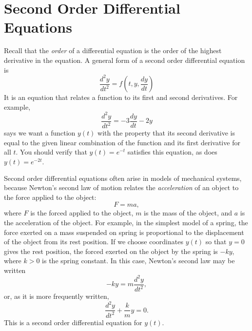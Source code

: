 \documentclass[reqno]{immbook}
\numberwithin{equation}{chapter}
\numberwithin{question}{section}
\numberwithin{theorem}{chapter}
\numberwithin{figure}{chapter}
\theoremstyle{definition}
\begin{document}
\section{Second Order Differential Equations}
Recall that the \emph{order} of a differential equation
is the order of the highest derivative in the equation.
A general form of a second order differential equation is
\begin{equation}
   \frac{d^2y}{dt^2} = f\left(t,y,\frac{dy}{dt}\right)
\label{eqn:generalsecondorder}
\end{equation}
It is an equation that relates a function to its first
and second derivatives.  For example,
\begin{equation}
  \frac{d^2y}{dt^2} = -3\frac{dy}{dt}-2y
  \label{eqn:linearexample} 
\end{equation}
says we want a function $y(t)$ with the property that its second derivative
is equal to the given linear combination of the function and  its first derivative
for all $t$.  You should verify that $y(t)=e^{-t}$ satisfies this equation,
as does $y(t) = e^{-2t}$.

Second order differential equations often arise in models
of mechanical systems, because Newton's second law of motion
relates the \emph{acceleration} of an object to the force applied
to the object:
\begin{equation}
   F = ma,
\end{equation}
where $F$ is the forced applied to the object, $m$ is the
mass of the object, and $a$ is the acceleration of the object.
For example, in the simplest model of a spring, the force
exerted on a mass suspended on spring is proportional to the
displacement of the object from its rest position.
If we choose coordinates $y(t)$ so that $y=0$ gives the
rest position, the forced exerted on the object by
the spring is $-ky$, where $k>0$ is the spring constant.
In this case, Newton's second law may be written
\begin{equation}
   -ky = m\frac{d^2y}{dt^2},  
\end{equation}
or, as it is more frequently written,
\begin{equation}
   \frac{d^2y}{dt^2} + \frac{k}{m}y = 0.
\end{equation}
This is a second order differential equation for $y(t)$.
\end{document}
